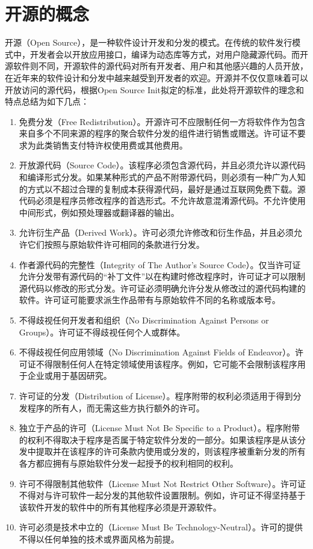 \documentclass[UTF8]{ctexart}
\begin{document}
\section{开源的概念}
开源（Open Source），是一种软件设计开发和分发的模式。\cite{enwiki:1043831936}在传统的软件发行模式中，开发者会以开放应用接口，编译为动态库等方式，对用户隐藏源代码。而开源软件则不同，开源软件的源代码对所有开发者、用户和其他感兴趣的人员开放，在近年来的软件设计和分发中越来越受到开发者的欢迎。开源并不仅仅意味着可以开放访问的源代码，根据Open Source Init拟定的标准，此处将开源软件的理念和特点总结为如下几点\cite{opensourceinit}：
\begin{enumerate}
    \item 免费分发（Free Redistribution）。开源许可不应限制任何一方将软件作为包含来自多个不同来源的程序的聚合软件分发的组件进行销售或赠送。许可证不要求为此类销售支付特许权使用费或其他费用。
    \item 开放源代码（Source Code）。该程序必须包含源代码，并且必须允许以源代码和编译形式分发。如果某种形式的产品不附带源代码，则必须有一种广为人知的方式以不超过合理的复制成本获得源代码，最好是通过互联网免费下载。源代码必须是程序员修改程序的首选形式。不允许故意混淆源代码。不允许使用中间形式，例如预处理器或翻译器的输出。
    \item 允许衍生产品（Derived Work）。许可必须允许修改和衍生作品，并且必须允许它们按照与原始软件许可相同的条款进行分发。
    \item 作者源代码的完整性（Integrity of The Author's Source Code）。仅当许可证允许分发带有源代码的“补丁文件”以在构建时修改程序时，许可证才可以限制源代码以修改的形式分发。许可证必须明确允许分发从修改过的源代码构建的软件。许可证可能要求派生作品带有与原始软件不同的名称或版本号。
    \item 不得歧视任何开发者和组织（No Discrimination Against Persons or Groups）。许可证不得歧视任何个人或群体。
    \item 不得歧视任何应用领域（No Discrimination Against Fields of Endeavor）。许可证不得限制任何人在特定领域使用该程序。例如，它可能不会限制该程序用于企业或用于基因研究。
    \item 许可证的分发（Distribution of License）。程序附带的权利必须适用于得到分发程序的所有人，而无需这些方执行额外的许可。
    \item 独立于产品的许可（License Must Not Be Specific to a Product）。程序附带的权利不得取决于程序是否属于特定软件分发的一部分。如果该程序是从该分发中提取并在该程序的许可条款内使用或分发的，则该程序被重新分发的所有各方都应拥有与原始软件分发一起授予的权利相同的权利。
    \item 许可不得限制其他软件（License Must Not Restrict Other Software）。许可证不得对与许可软件一起分发的其他软件设置限制。例如，许可证不得坚持基于该软件开发的软件中的所有其他程序必须是开源软件。
    \item 许可必须是技术中立的（License Must Be Technology-Neutral）。许可的提供不得以任何单独的技术或界面风格为前提。
\end{enumerate}
\end{document}
